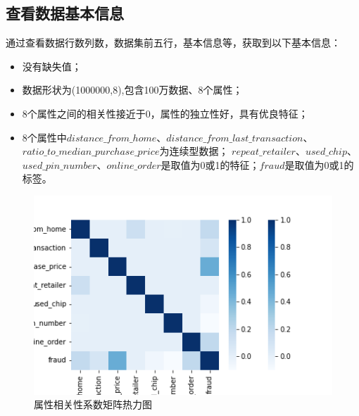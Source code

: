 \subsection{查看数据基本信息}
通过查看数据行数列数，数据集前五行，基本信息等，获取到以下基本信息：
\begin{itemize}
	\item 没有缺失值；
	\item 数据形状为(1000000,8),包含100万数据、8个属性；
	\item 8个属性之间的相关性接近于0，属性的独立性好，具有优良特征；
	\item 8个属性中$distance\_from\_home$、$distance\_from\_last\_transaction$、$ratio\_to\_median\_purchase\_price$为连续型数据； $repeat\_retailer$、$used\_chip$、$used\_pin\_number$、$online\_order$是取值为0或1的特征；$fraud$是取值为0或1的标签。
\end{itemize}
\begin{figure}[H]
	\centering
	\includegraphics[scale=0.6,angle=0]{images/5.png}
	\caption{属性相关性系数矩阵热力图}
	\label{5}
\end{figure}
\clearpage
